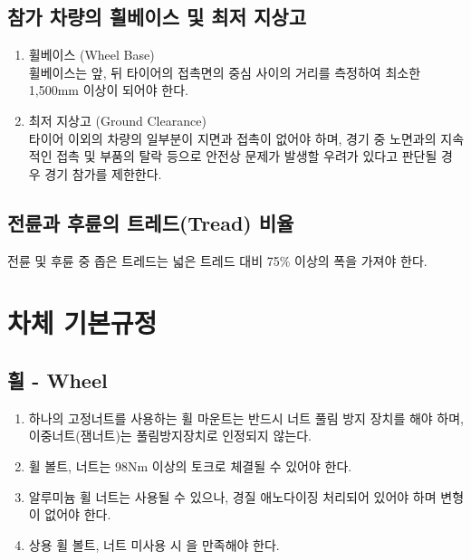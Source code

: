 \documentclass[a4paper,10pt]{report}
\begin{document}
\section{참가 차량의 휠베이스 및 최저 지상고}

\begin{enumerate}
  \item 휠베이스 (Wheel Base)\\
    휠베이스는 앞, 뒤 타이어의 접촉면의 중심 사이의 거리를 측정하여 최소한 1,500mm 이상이 되어야 한다.
  \item 최저 지상고 (Ground Clearance)\\
    타이어 이외의 차량의 일부분이 지면과 접촉이 없어야 하며, 경기 중 노면과의 지속적인 접촉 및 부품의 탈락 등으로 안전상 문제가 발생할 우려가 있다고 판단될 경우 경기 참가를 제한한다.
\end{enumerate}

\section{전륜과 후륜의 트레드(Tread) 비율}

전륜 및 후륜 중 좁은 트레드는 넓은 트레드 대비 75\% 이상의 폭을 가져야 한다.

\chapter{차체 기본규정}

\section{휠 - Wheel}

\begin{enumerate}
  \item 하나의 고정너트를 사용하는 휠 마운트는 반드시 너트 풀림 방지 장치를 해야 하며, 이중너트(잼너트)는 풀림방지장치로 인정되지 않는다.
  \item \label{item:bolt_nut_torque} 휠 볼트, 너트는 98Nm 이상의 토크로 체결될 수 있어야 한다.
  \item 알루미늄 휠 너트는 사용될 수 있으나, 경질 애노다이징 처리되어 있어야 하며 변형이 없어야 한다.
  \item 상용 휠 볼트, 너트 미사용 시 을 만족해야 한다.
\end{enumerate}

\end{document}
